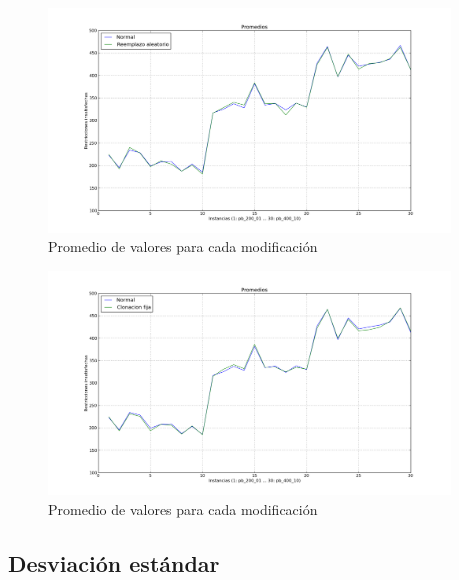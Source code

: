 \begin{figure}[h!]
\begin{center}
\includegraphics[width=0.95\textwidth]{img/prom-3.pdf}
\end{center}
\caption{Promedio de valores para cada modificación}
\label{fig:prom-3}
\end{figure}


\begin{figure}[h!]
\begin{center}
\includegraphics[width=0.95\textwidth]{img/prom-4.pdf}
\end{center}
\caption{Promedio de valores para cada modificación}
\label{fig:prom-4}
\end{figure}

\newpage

\subsection{Desviación estándar}

